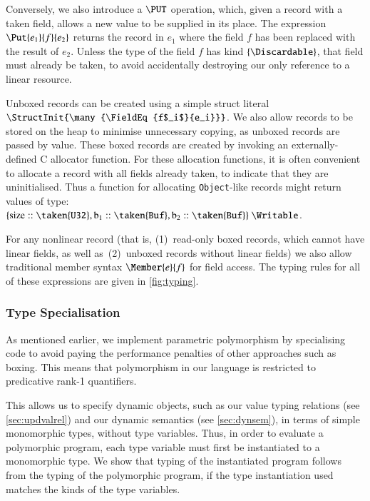 \documentclass[9pt\ifFinal\else,preprint,nocopyrightspace\fi,\ifAlpha\else natbib,authoryear\fi]{sigplanconf}
\begin{document}
Conversely, we also introduce a $\PUT$ operation, which, given a record with a taken field, allows a new value to be supplied in its place. The expression $\Put{e_1}{f}{e_2}$ returns the
record in $e_1$ where the field $f$ has been replaced with the result of $e_2$. Unless the type of the field $f$ has kind $\{\Discardable\}$, that field must already be taken, to avoid
accidentally destroying our only reference to a linear resource.

Unboxed records can be created using a simple struct literal $\StructInit{\many{\FieldEq{f$_i$}{e_i}}}$. We also allow records to be stored on the heap to minimise unnecessary copying,
as unboxed records are passed by value.  These boxed records are created by invoking an externally-defined C allocator function.
For these allocation functions, it is often convenient to allocate a record with all fields already taken, to indicate that they are uninitialised. Thus a function for allocating
\texttt{Object}-like records might return values of type: $ \{ \text{size} :: \taken{\mathtt{U32}}, \text{b}_1 :: \taken{\mathtt{Buf}}, \text{b}_2 :: \taken{\mathtt{Buf}} \}\ \Writable$.

For any nonlinear record (that is, (1)~read-only boxed records, which cannot have linear fields, as well as~(2)~unboxed records without linear fields)
 we also allow traditional member syntax $\Member{e}{f}$ for field access. The typing rules for all of these expressions are given in \autoref{fig:typing}. 

\subsubsection{Type Specialisation} 
\label{sec:typing:poly}
As mentioned earlier, we implement parametric polymorphism by specialising code to avoid paying the performance penalties of other approaches such as
boxing. This means that polymorphism in our language is restricted to predicative rank-1 quantifiers.

This allows us to specify dynamic objects, such as our value typing relations (see \autoref{sec:updvalrel}) and our dynamic semantics (see \autoref{sec:dynsem}), in
terms of simple monomorphic types, without type variables. Thus, in order to evaluate a polymorphic program, each type variable must first be instantiated
to a monomorphic type. We show that typing of the instantiated program follows from the typing of the polymorphic program, if the type instantiation used matches
the kinds of the type variables.
\end{document}
